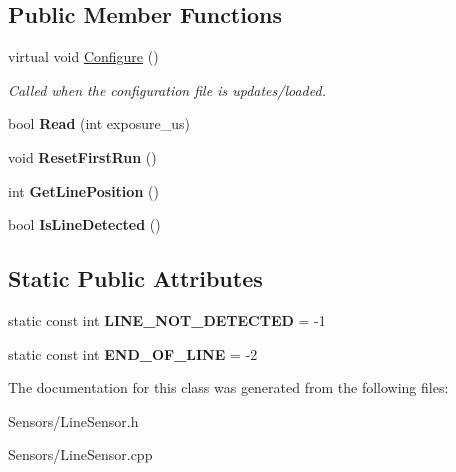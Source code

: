 \subsection*{\-Public \-Member \-Functions}
\begin{DoxyCompactItemize}
\item 
\hypertarget{class_line_sensor_a8005f7b443337c70ad731adc28a249f4}{
virtual void \hyperlink{class_line_sensor_a8005f7b443337c70ad731adc28a249f4}{\-Configure} ()}
\label{class_line_sensor_a8005f7b443337c70ad731adc28a249f4}

\begin{DoxyCompactList}\small\item\em \-Called when the configuration file is updates/loaded. \end{DoxyCompactList}\item 
\hypertarget{class_line_sensor_a18019d78c0cfefa037de88c6abc0d988}{
bool {\bfseries \-Read} (int exposure\-\_\-us)}
\label{class_line_sensor_a18019d78c0cfefa037de88c6abc0d988}

\item 
\hypertarget{class_line_sensor_a7a61de8e8ff1cd814b0cc1c7f8a01795}{
void {\bfseries \-Reset\-First\-Run} ()}
\label{class_line_sensor_a7a61de8e8ff1cd814b0cc1c7f8a01795}

\item 
\hypertarget{class_line_sensor_a365fe0a43893c63994b69aa1eeca3e6e}{
int {\bfseries \-Get\-Line\-Position} ()}
\label{class_line_sensor_a365fe0a43893c63994b69aa1eeca3e6e}

\item 
\hypertarget{class_line_sensor_a6cb75555e1eb667072225182d3c73842}{
bool {\bfseries \-Is\-Line\-Detected} ()}
\label{class_line_sensor_a6cb75555e1eb667072225182d3c73842}

\end{DoxyCompactItemize}
\subsection*{\-Static \-Public \-Attributes}
\begin{DoxyCompactItemize}
\item 
\hypertarget{class_line_sensor_a6113b1060280775c6d230fde3811b97d}{
static const int {\bfseries \-L\-I\-N\-E\-\_\-\-N\-O\-T\-\_\-\-D\-E\-T\-E\-C\-T\-E\-D} = -\/1}
\label{class_line_sensor_a6113b1060280775c6d230fde3811b97d}

\item 
\hypertarget{class_line_sensor_a79089008589a2472a20ea89ca90c20b5}{
static const int {\bfseries \-E\-N\-D\-\_\-\-O\-F\-\_\-\-L\-I\-N\-E} = -\/2}
\label{class_line_sensor_a79089008589a2472a20ea89ca90c20b5}

\end{DoxyCompactItemize}


\-The documentation for this class was generated from the following files\-:\begin{DoxyCompactItemize}
\item 
\-Sensors/\-Line\-Sensor.\-h\item 
\-Sensors/\-Line\-Sensor.\-cpp\end{DoxyCompactItemize}
